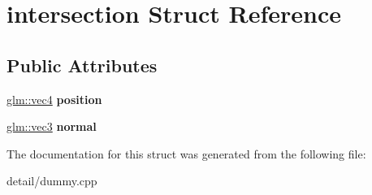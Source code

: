 \hypertarget{structintersection}{\section{intersection Struct Reference}
\label{structintersection}
}
\subsection*{Public Attributes}
\begin{DoxyCompactItemize}
\item 
\hypertarget{structintersection_a7a33f425d759e3e1240499a7f527b914}{\hyperlink{group__core__types_ga5881b1b022d7fd1b7218f5916532dd02}{glm\-::vec4} {\bfseries position}}\label{structintersection_a7a33f425d759e3e1240499a7f527b914}

\item 
\hypertarget{structintersection_a4db60aeaf032905a89ca8382914b44e4}{\hyperlink{group__core__types_ga1c47e8b3386109bc992b6c48e91b0be7}{glm\-::vec3} {\bfseries normal}}\label{structintersection_a4db60aeaf032905a89ca8382914b44e4}

\end{DoxyCompactItemize}


The documentation for this struct was generated from the following file\-:\begin{DoxyCompactItemize}
\item 
detail/dummy.\-cpp\end{DoxyCompactItemize}

